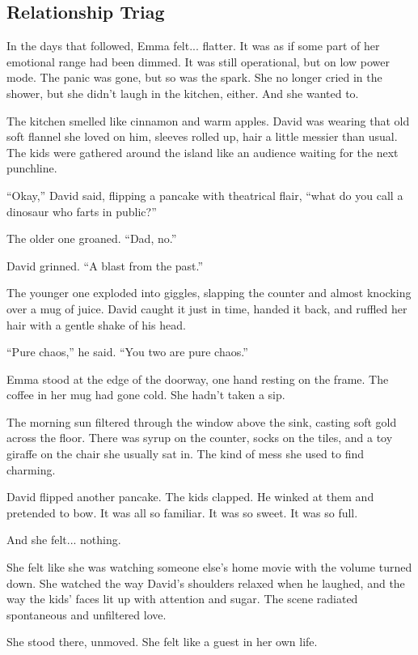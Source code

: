 
\subsection{Relationship Triag}

In the days that followed, Emma felt... flatter. It was as if some part of her emotional 
range had been dimmed. It was still operational, but on low power mode. The panic was gone, but 
so was the 
spark. She no longer cried in the shower, but she didn’t laugh in the kitchen, either. And she 
wanted to.

The kitchen smelled like cinnamon and warm apples. David was wearing that old soft flannel she loved on 
him, sleeves rolled up, hair a little messier than usual. The kids were gathered around the island like 
an audience waiting for the next punchline.

``Okay,'' David said, flipping a pancake with theatrical flair, ``what do you call a dinosaur who farts 
in public?''

The older one groaned. ``Dad, no.''

David grinned. ``A blast from the past.''

The younger one exploded into giggles, slapping the counter and almost knocking over a mug of juice.
David caught it just in time, handed it back, and ruffled her hair with a gentle shake of his head.

``Pure chaos,'' he said. ``You two are pure chaos.''

Emma stood at the edge of the doorway, one hand resting on the frame. The coffee in her mug had gone cold. 
She hadn’t taken a sip.

The morning sun filtered through the window above the sink, casting soft gold across the floor. 
There was 
syrup on the counter, socks on the tiles, and a toy giraffe on the chair she usually sat in. The 
kind of mess 
she used to find charming. 

David flipped another pancake. The kids clapped. He winked at them and pretended to bow. It was 
all so familiar. 
It was so sweet. It was so full.

And she felt... nothing.

She felt like she was watching someone else’s home movie with the volume turned down. She watched 
the way David’s 
shoulders relaxed when he laughed, and the way the kids’ faces lit up with attention and sugar. 
The scene 
radiated spontaneous and unfiltered love.

She stood there, unmoved. She felt like a guest in her own life.

